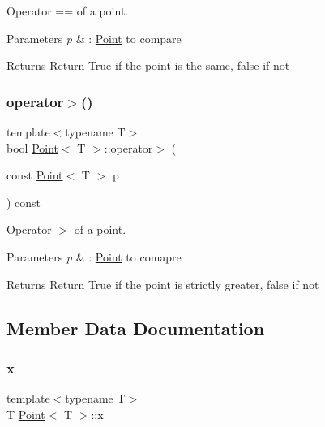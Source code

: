Operator == of a point. 


\begin{DoxyParams}{Parameters}
{\em p} & \+: \hyperlink{classPoint}{Point} to compare \\
\hline
\end{DoxyParams}
\begin{DoxyReturn}{Returns}
Return True if the point is the same, false if not 
\end{DoxyReturn}
\mbox{\label{classPoint_ade386be90f64de342ada7165415daf07}} 
\subsubsection{\texorpdfstring{operator$>$()}{operator>()}}
{\footnotesize\ttfamily template$<$typename T$>$ \\
bool \hyperlink{classPoint}{Point}$<$ T $>$\+::operator$>$ (\begin{DoxyParamCaption}\item[{const \hyperlink{classPoint}{Point}$<$ T $>$}]{p }\end{DoxyParamCaption}) const\hspace{0.3cm}{\ttfamily [inline]}}



Operator $>$ of a point. 


\begin{DoxyParams}{Parameters}
{\em p} & \+: \hyperlink{classPoint}{Point} to comapre \\
\hline
\end{DoxyParams}
\begin{DoxyReturn}{Returns}
Return True if the point is strictly greater, false if not 
\end{DoxyReturn}


\subsection{Member Data Documentation}
\mbox{\label{classPoint_a401d07562afaf0079121218025e66b76}} 
\subsubsection{\texorpdfstring{x}{x}}
{\footnotesize\ttfamily template$<$typename T$>$ \\
T \hyperlink{classPoint}{Point}$<$ T $>$\+::x}

